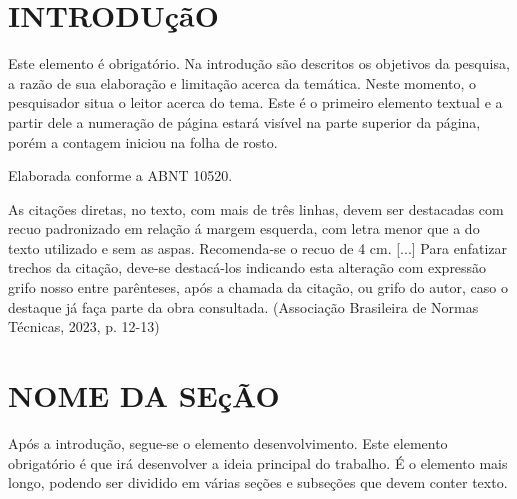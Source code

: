 \documentclass[
        oneside, %
        english,
        brazil
        ]{abntbibufjf}
\begin{document}
\textual


\chapter{INTRODUçãO}  %

Este elemento \'e obrigatório. Na introdução são descritos os objetivos da pesquisa, a razão de sua elaboração e limitação acerca da
temática. Neste momento, o pesquisador situa o leitor acerca do tema. Este \'e o primeiro elemento textual e a partir dele a numeração de página
estará visível na parte superior da página, por\'em a contagem iniciou na folha de rosto.

Elaborada conforme a ABNT 10520.

\begin{citacao}
    As citaç\~oes diretas, no texto, com mais de três linhas, devem ser destacadas
    com recuo padronizado em relação á margem esquerda, com letra menor que a do texto utilizado
    e sem as aspas. Recomenda-se o recuo de 4 cm. [...] Para enfatizar trechos da citação, deve-se destacá-los indicando esta
    alteração com expressão grifo nosso entre parênteses, após a chamada da citação, ou grifo
    do autor, caso o destaque já faça parte da obra consultada. (Associação Brasileira de Normas
    T\'ecnicas, 2023, p. 12-13)
\end{citacao}



\chapter{NOME DA SEç\~{A}O} %

Após a introdução, segue-se o elemento desenvolvimento. Este elemento obrigatório \'e que irá desenvolver a ideia principal do trabalho.
\'E o elemento mais longo, podendo ser dividido em várias seç\~oes %
e subseç\~oes que devem conter texto.
\end{document}
